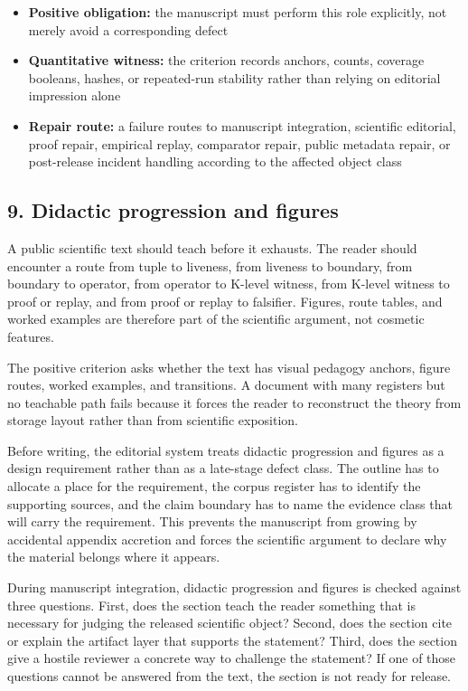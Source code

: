 \begin{itemize}[leftmargin=1.8em]

\item \textbf{Positive obligation:} the manuscript must perform this role explicitly, not merely avoid a corresponding defect

\item \textbf{Quantitative witness:} the criterion records anchors, counts, coverage booleans, hashes, or repeated-run stability rather than relying on editorial impression alone

\item \textbf{Repair route:} a failure routes to manuscript integration, scientific editorial, proof repair, empirical replay, comparator repair, public metadata repair, or post-release incident handling according to the affected object class

\end{itemize}

\subsection{9. Didactic progression and figures}

A public scientific text should teach before it exhausts. The reader should encounter a route from tuple to liveness, from liveness to boundary, from boundary to operator, from operator to K-level witness, from K-level witness to proof or replay, and from proof or replay to falsifier. Figures, route tables, and worked examples are therefore part of the scientific argument, not cosmetic features.


The positive criterion asks whether the text has visual pedagogy anchors, figure routes, worked examples, and transitions. A document with many registers but no teachable path fails because it forces the reader to reconstruct the theory from storage layout rather than from scientific exposition.


Before writing, the editorial system treats didactic progression and figures as a design requirement rather than as a late-stage defect class. The outline has to allocate a place for the requirement, the corpus register has to identify the supporting sources, and the claim boundary has to name the evidence class that will carry the requirement. This prevents the manuscript from growing by accidental appendix accretion and forces the scientific argument to declare why the material belongs where it appears.


During manuscript integration, didactic progression and figures is checked against three questions. First, does the section teach the reader something that is necessary for judging the released scientific object? Second, does the section cite or explain the artifact layer that supports the statement? Third, does the section give a hostile reviewer a concrete way to challenge the statement? If one of those questions cannot be answered from the text, the section is not ready for release.


